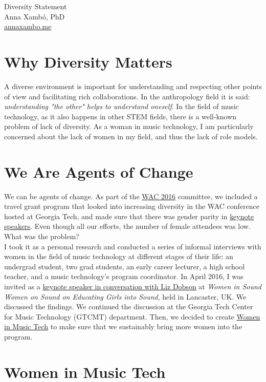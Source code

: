 \documentclass[10pt, a4paper]{article}
\begin{document}
{\LARGE Diversity Statement}\\[0.2cm]
Anna Xambó, PhD\\
\href{http://annaxambo.me}{annaxambo.me}

\section*{Why Diversity Matters}

A diverse environment is important for understanding and respecting other points of view and facilitating rich collaborations. In the anthropology field it is said: \emph{understanding "the other" helps to understand oneself}. In the field of music technology, as it also happens in other STEM fields, there is a well-known problem of lack of diversity. As a woman in music technology, I am particularly concerned about the lack of women in my field, and thus the lack of role models.

\section*{We Are Agents of Change}

We can be agents of change. As part of the \href{http://webaudio.gatech.edu/}{WAC 2016} committee, we included a travel grant program that looked into increasing diversity in the WAC conference hosted at Georgia Tech, and made sure that there was gender parity in \href{http://webaudio.gatech.edu/keynotes}{keynote speakers}. Even though all our efforts, the number of female attendees was low. What was the problem?\\

I took it as a personal research and conducted a series of informal interviews with women in the field of music technology at different stages of their life: an undergrad student, two grad students, an early career lecturer, a high school teacher, and a music technology's program coordinator. In April 2016, I was invited as a \href{http://wiswos.bitbucket.org/index.html\%3Fp=435.html}{keynote speaker in conversation with Liz Dobson} at \emph{Women in Sound Women on Sound on Educating Girls into Sound}, held in Lancaster, UK. We discussed the findings. We continued the discussion at the Georgia Tech Center for Music Technology (GTCMT) department. Then, we decided to create \href{http://www.gtcmt.gatech.edu/}{Women in Music Tech} to make sure that we sustainably bring more women into the program.

\section*{Women in Music Tech}
\end{document}
